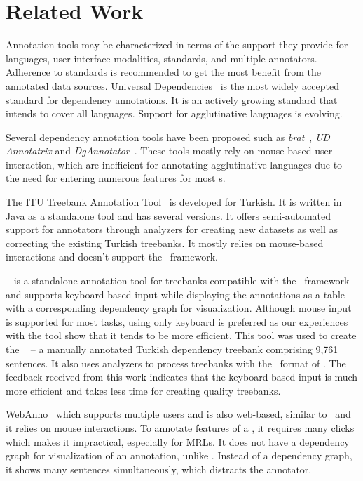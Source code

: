 \section{Related Work}
\label{sec:related}

Annotation tools may be characterized in terms of the support they provide for languages, user interface modalities, standards, and multiple annotators.
Adherence to standards is recommended to get the most benefit from the annotated data sources.
Universal Dependencies~\cite{UD} is the most widely accepted standard for dependency annotations.
It is an actively growing standard that intends to cover all languages.
Support for agglutinative languages is evolving.

Several dependency annotation tools have been proposed such as \textit{brat}~\cite{brat}, \textit{UD Annotatrix} and \textit{DgAnnotator}~\cite{UD-tools}.
These tools mostly rely on mouse-based user interaction, which are inefficient for annotating agglutinative languages due to the need for entering numerous features for most \form s.

The ITU Treebank Annotation Tool~\cite{pamay-etal-2015-annotation} is developed for Turkish.
It is written in Java as a standalone tool and has several versions.
It offers semi-automated support for annotators through analyzers for creating new datasets as well as correcting the existing Turkish treebanks.
It mostly relies on mouse-based interactions and doesn't support the \ud\ framework.

\boatvone~\cite{turk-etal-2019-turkish} is a standalone annotation tool for treebanks compatible with the \ud\ framework~\cite{UD} and supports keyboard-based input while displaying the annotations as a table with a corresponding dependency graph for visualization.
Although mouse input is supported for most tasks, using only keyboard is preferred as our experiences with the tool show that it tends to be more efficient.
This tool was used to create the \bountreebank~\cite{turk2021resources,UD-Boun-Treebank} -- a manually annotated Turkish dependency treebank comprising 9,761 sentences.
It also uses analyzers to process treebanks with the \conllu\ format of \ud.
The feedback received from this work indicates that the keyboard based input is much more efficient and takes less time for creating quality treebanks.

WebAnno~\cite{webanno} which supports multiple users and is also web-based, similar to \boatvtwo\ and it relies on mouse interactions.
To annotate features of a \form, it requires many clicks which makes it impractical, especially for MRLs.
It does not have a dependency graph for visualization of an annotation, unlike \boatvone. Instead of a dependency graph, it shows many sentences simultaneously, which distracts the annotator.

